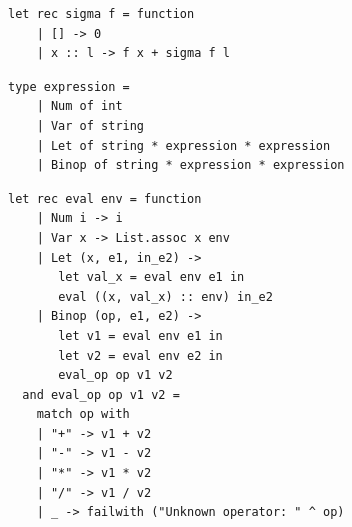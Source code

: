 \documentclass[12pt,twoside,notitlepage]{report}
\begin{document}
\begin{minipage}{\linewidth}
\begin{lstlisting}[caption={OCaml higher order functions example}]
let rec sigma f = function
    | [] -> 0
    | x :: l -> f x + sigma f l
\end{lstlisting}
\end{minipage}
    
\begin{minipage}{\linewidth}
\begin{lstlisting}[caption={OCaml data structure example}]
type expression =
    | Num of int
    | Var of string
    | Let of string * expression * expression
    | Binop of string * expression * expression
\end{lstlisting}
\end{minipage}
    
\begin{minipage}{\linewidth}
\begin{lstlisting}[caption={OCaml evaluation function example}]    
let rec eval env = function
    | Num i -> i
    | Var x -> List.assoc x env
    | Let (x, e1, in_e2) ->
       let val_x = eval env e1 in
       eval ((x, val_x) :: env) in_e2
    | Binop (op, e1, e2) ->
       let v1 = eval env e1 in
       let v2 = eval env e2 in
       eval_op op v1 v2
  and eval_op op v1 v2 =
    match op with
    | "+" -> v1 + v2
    | "-" -> v1 - v2
    | "*" -> v1 * v2
    | "/" -> v1 / v2
    | _ -> failwith ("Unknown operator: " ^ op)
\end{lstlisting}
\end{minipage}



\cleardoublepage
\end{document}
